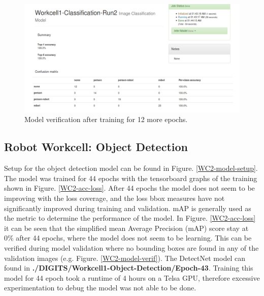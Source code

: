 \documentclass[10pt,journal,compsoc]{IEEEtran}
\begin{document}
\begin{figure}[thpb]
  \centering
  \includegraphics[width=\linewidth]{../img/Workcell1-Classification/Run2/WC1-2-Overfit.png}
  \caption{Model verification after training for 12 more epochs.}
  \label{WC1-verification_2}
\end{figure}


\subsection{Robot Workcell: Object Detection}

Setup for the object detection model can be found in Figure. \ref{WC2-model-setup}. The model was trained for 44 epochs with the tensorboard graphs of the training shown in Figure. \ref{WC2-acc-loss}. After 44 epochs the model does not seem to be improving with the loss coverage, and the loss bbox measures have not significantly improved during training and validation. mAP is generally used as the metric to determine the performance of the model. In Figure. \ref{WC2-acc-loss} it can be seen that the simplified mean Average Precision (mAP) score stay at 0\% after 44 epochs, where the model does not seem to be learning. This can be verified during model validation where no bounding boxes are found in any of the validation images (e.g. Figure. \ref{WC2-model-verif}). The DetectNet model can found in \textbf{ ./DIGITS/Workcell1-Object-Detection/Epoch-43}. Training this model for 44 epoch took a runtime of 4 hours on a Telsa GPU, therefore excessive experimentation to debug the model was not able to be done.
\end{document}
